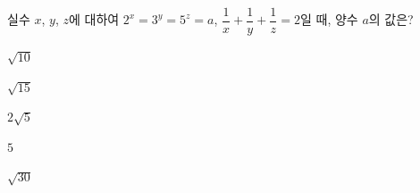 실수 $x$, $y$, $z$에 대하여 $2^x=3^y=5^z=a$, $\dfrac{1}{x}+\dfrac{1}{y}+\dfrac{1}{z}=2$일 때, 양수 $a$의 값은?
\begin{choices32}{\rule[-3ex]{0pt}{8ex}$\sqrt{10}$}{\rule[-3ex]{0pt}{8ex}$\sqrt{15}$}{\rule[-3ex]{0pt}{8ex}$2\sqrt{5}$}{\rule[-3ex]{0pt}{8ex}$5$}{\rule[-3ex]{0pt}{8ex}$\sqrt{30}$}\end{choices32}
